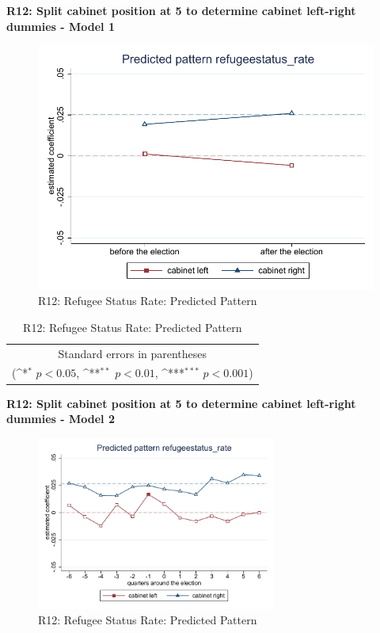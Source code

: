 \documentclass[10pt,a4paper]{scrartcl}
\begin{document}
\clearpage
\textbf{R12: Split cabinet position at 5 to determine cabinet left-right dummies - Model 1}
\begin{figure}[!ht]
	\centering
	\includegraphics[width=1\textwidth]{figures_edited/refugeestatus_rate_graph1_R12.pdf}
	\caption{R12: Refugee Status Rate: Predicted Pattern}
\end{figure}

\begin{table}[!ht]\centering
	\renewcommand{\arraystretch}{1.25}
	\def\sym#1{\ifmmode^{#1}\else\(^{#1}\)\fi}
	\caption{R12: Refugee Status Rate: Predicted Pattern}
	\begin{tabular}{l*{2}{c}}
		\hline\hline
		
		\hline\hline
		\multicolumn{3}{c}{\footnotesize Standard errors in parentheses} \\
		\multicolumn{3}{c}{\footnotesize (\sym{*} \(p<0.05\), \sym{**} \(p<0.01\), \sym{***} \(p<0.001\))}\\
	\end{tabular}
\end{table}

\clearpage
\textbf{R12: Split cabinet position at 5 to determine cabinet left-right dummies - Model 2}
\begin{figure}[!ht]
	\centering
	\includegraphics[width=0.7\textwidth]{figures_edited/refugeestatus_rate_graph2_R12.pdf}
	\caption{R12: Refugee Status Rate: Predicted Pattern}
\end{figure}
\end{document}
